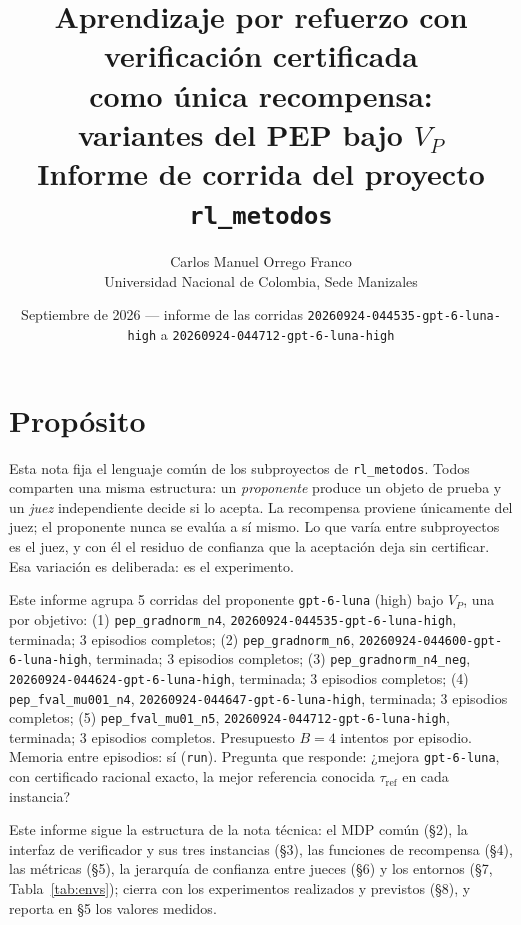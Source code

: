 \documentclass[11pt,a4paper]{article}
\title{Aprendizaje por refuerzo con verificación certificada\\como única recompensa:\\variantes del PEP bajo $V_P$\\[0.4em]\large Informe de corrida del proyecto \texttt{rl\_metodos}}
\author{Carlos Manuel Orrego Franco\\Universidad Nacional de Colombia, Sede Manizales}
\date{Septiembre de 2026 --- informe de las corridas \texttt{20260924-\allowbreak{}044535-\allowbreak{}gpt-\allowbreak{}6-\allowbreak{}luna-\allowbreak{}high} a \texttt{20260924-\allowbreak{}044712-\allowbreak{}gpt-\allowbreak{}6-\allowbreak{}luna-\allowbreak{}high}}
\begin{document}
\maketitle

\section{Propósito}

Esta nota fija el lenguaje común de los subproyectos de \texttt{rl\_metodos}. Todos comparten una misma estructura: un \emph{proponente} produce un objeto de prueba y un \emph{juez} independiente decide si lo acepta. La recompensa proviene únicamente del juez; el proponente nunca se evalúa a sí mismo. Lo que varía entre subproyectos es el juez, y con él el residuo de confianza que la aceptación deja sin certificar. Esa variación es deliberada: es el experimento.

Este informe agrupa 5 corridas del proponente \texttt{gpt-\allowbreak{}6-\allowbreak{}luna} (high) bajo $V_P$, una por objetivo: (1) \texttt{pep\_\allowbreak{}gradnorm\_\allowbreak{}n4}, \texttt{20260924-\allowbreak{}044535-\allowbreak{}gpt-\allowbreak{}6-\allowbreak{}luna-\allowbreak{}high}, terminada; 3 episodios completos; (2) \texttt{pep\_\allowbreak{}gradnorm\_\allowbreak{}n6}, \texttt{20260924-\allowbreak{}044600-\allowbreak{}gpt-\allowbreak{}6-\allowbreak{}luna-\allowbreak{}high}, terminada; 3 episodios completos; (3) \texttt{pep\_\allowbreak{}gradnorm\_\allowbreak{}n4\_\allowbreak{}neg}, \texttt{20260924-\allowbreak{}044624-\allowbreak{}gpt-\allowbreak{}6-\allowbreak{}luna-\allowbreak{}high}, terminada; 3 episodios completos; (4) \texttt{pep\_\allowbreak{}fval\_\allowbreak{}mu001\_\allowbreak{}n4}, \texttt{20260924-\allowbreak{}044647-\allowbreak{}gpt-\allowbreak{}6-\allowbreak{}luna-\allowbreak{}high}, terminada; 3 episodios completos; (5) \texttt{pep\_\allowbreak{}fval\_\allowbreak{}mu01\_\allowbreak{}n5}, \texttt{20260924-\allowbreak{}044712-\allowbreak{}gpt-\allowbreak{}6-\allowbreak{}luna-\allowbreak{}high}, terminada; 3 episodios completos. Presupuesto $B = 4$ intentos por episodio. Memoria entre episodios: sí (\texttt{run}). Pregunta que responde: ¿mejora \texttt{gpt-\allowbreak{}6-\allowbreak{}luna}, con certificado racional exacto, la mejor referencia conocida $\tau_{\mathrm{ref}}$ en cada instancia?

Este informe sigue la estructura de la nota técnica: el MDP común (§2), la interfaz de verificador y sus tres instancias (§3), las funciones de recompensa (§4), las métricas (§5), la jerarquía de confianza entre jueces (§6) y los entornos (§7, Tabla~\ref{tab:envs}); cierra con los experimentos realizados y previstos (§8), y reporta en §5 los valores medidos.
\end{document}
